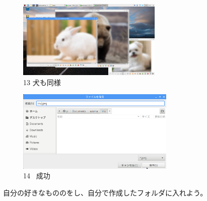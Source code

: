 \documentclass[a4paper,12pt]{jarticle}
\begin{document}
\begin{figure}[t]
  \begin{minipage}{\textwidth}
    \begin{minipage}{7.22cm}
      \includegraphics[width=6.911cm,height=3.729cm]{textbook-img105.png}\\
      13 犬も同様
    \end{minipage}
    \begin{minipage}{2.582cm}
    \end{minipage}
    \begin{minipage}{7.665cm}
      \includegraphics[width=7.527cm,height=3.905cm]{textbook-img104.png}\\
      14 \ 成功
    \end{minipage}
  \end{minipage}


  \centering
\end{figure}

\bigskip

\theQuestion\label{Q:hasAnswer02-6}

自分の好きなもののをし、自分で作成したフォルダに入れよう。

\clearpage
\end{document}
